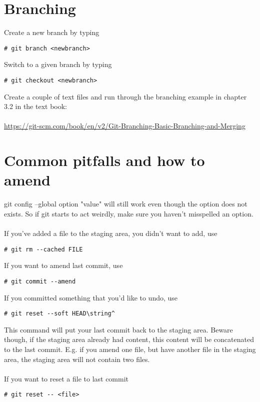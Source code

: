\documentclass[10pt,a4paper]{article}
\begin{document}
\section{Branching}
Create a new branch by typing
\begin{lstlisting}
# git branch <newbranch>
\end{lstlisting}
Switch to a given branch by typing 
\begin{lstlisting}
# git checkout <newbranch>
\end{lstlisting}
Create a couple of text files and run through the branching example in chapter 3.2 in the text book:
\\\\
\url{https://git-scm.com/book/en/v2/Git-Branching-Basic-Branching-and-Merging}



\section{Common pitfalls and how to amend}
git config --global option "value" will still work even though the option does not exists. So if git starts to act weirdly, make sure you haven't misspelled an option.
\\\\
If you've added a file to the staging area, you didn't want to add, use
\begin{lstlisting}
# git rm --cached FILE
\end{lstlisting}
If you want to amend last commit, use
\begin{lstlisting}
# git commit --amend
\end{lstlisting}
If you committed something that you'd like to undo, use
\begin{lstlisting}
# git reset --soft HEAD\string^
\end{lstlisting}
This command will put your last commit back to the staging area. Beware though, if the staging area already had content, this content will be concatenated to the last commit. E.g. if you amend one file, but have another file in the staging area, the staging area will not contain two files.
\\\\
If you want to reset a file to last commit
\begin{lstlisting}
# git reset -- <file>
\end{lstlisting}
\end{document}
